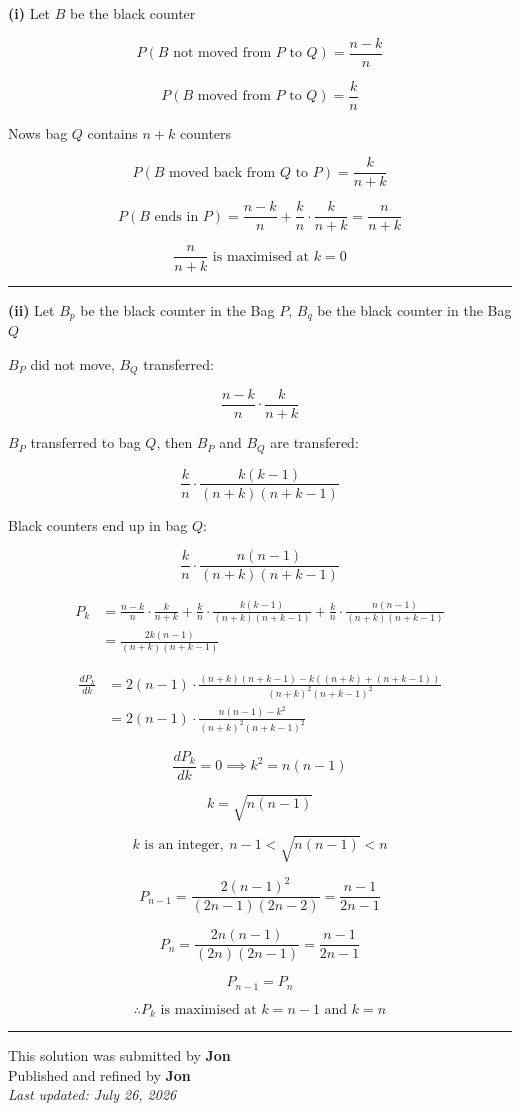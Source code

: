 \documentclass[12pt]{article}
\begin{document}
\newcommand{\ds}{\displaystyle}

\textbf{(i)} Let $B$ be the black counter

$$P(B\text{ not moved from }P\text{ to }Q)=\frac{n-k}{n}$$

$$P(B\text{ moved from }P\text{ to }Q)=\frac{k}{n}$$

Nows bag $Q$ contains $n+k$ counters

$$P(B\text{ moved back from }Q\text{ to }P)=\frac{k}{n+k}$$

$$P(B\text{ ends in }P)=\frac{n-k}{n}+\frac{k}{n}\cdot\frac{k}{n+k}=\frac{n}{n+k}$$

$$\frac{n}{n+k}\text{ is maximised at }k=0$$

\bigskip\hrule\bigskip

\textbf{(ii)} Let $B_p$ be the black counter in the Bag $P$, $B_q$ be the black counter in the Bag $Q$

$B_P$ did not move, $B_Q$ transferred:

$$\frac{n-k}{n}\cdot\frac{k}{n+k}$$

$B_P$ transferred to bag $Q$, then $B_P$ and $B_Q$ are transfered:

$$\frac{k}{n}\cdot\frac{k(k-1)}{(n+k)(n+k-1)}$$

Black counters end up in bag $Q$:

$$\frac{k}{n}\cdot\frac{n(n-1)}{(n+k)(n+k-1)}$$

\begin{align*}
P_k
&=\frac{n-k}{n}\cdot\frac{k}{n+k}
+\frac{k}{n}\cdot\frac{k(k-1)}{(n+k)(n+k-1)}
+\frac{k}{n}\cdot\frac{n(n-1)}{(n+k)(n+k-1)}\\
&=\frac{2k(n-1)}{(n+k)(n+k-1)}
\end{align*}

\begin{align*}
\frac{dP_k}{dk}
&=2(n-1)\cdot\frac{(n+k)(n+k-1)-k\left((n+k)+(n+k-1)\right)}{(n+k)^2(n+k-1)^2}\\
&=2(n-1)\cdot\frac{n(n-1)-k^2}{(n+k)^2(n+k-1)^2}
\end{align*}

$$\frac{dP_k}{dk}=0\implies k^2=n(n-1)$$

$$k=\sqrt{n(n-1)}$$

$$k\text{ is an integer},\ n-1<\sqrt{n(n-1)}<n$$

$$P_{n-1}=\frac{2(n-1)^2}{(2n-1)(2n-2)}=\frac{n-1}{2n-1}$$

$$P_n=\frac{2n(n-1)}{(2n)(2n-1)}=\frac{n-1}{2n-1}$$

$$P_{n-1}=P_n$$

$$\therefore P_k\text{ is maximised at }k=n-1\text{ and }k=n$$

\bigskip
\hrule
\begin{center}
    This solution was submitted by \textbf{Jon}\\[4pt]
    Published and refined by \textbf{Jon}\\[8pt]
    \textit{Last updated: July 26, 2026}
\end{center}
\end{document}

